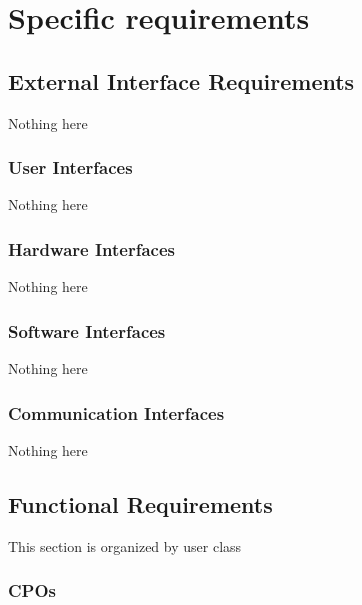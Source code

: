 \section{Specific requirements}

\subsection{External Interface Requirements}
Nothing here

\subsubsection{User Interfaces}
Nothing here

\subsubsection{Hardware Interfaces}
Nothing here

\subsubsection{Software Interfaces}
Nothing here

\subsubsection{Communication Interfaces}
Nothing here


\subsection{Functional Requirements}
This section is organized by user class

\subsubsection{CPOs}
